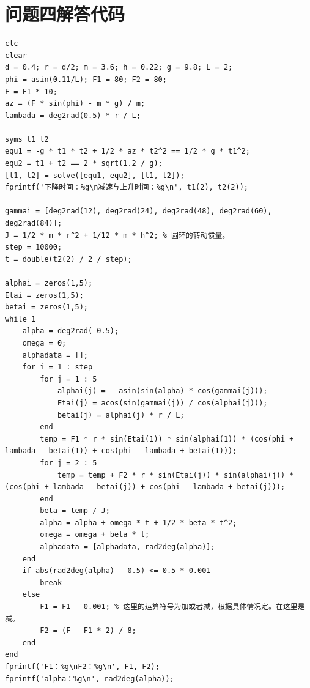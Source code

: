 \documentclass{cumcm}
\begin{document}
\section{问题四解答代码}
\begin{lstlisting}
clc
clear
d = 0.4; r = d/2; m = 3.6; h = 0.22; g = 9.8; L = 2;
phi = asin(0.11/L); F1 = 80; F2 = 80;
F = F1 * 10;
az = (F * sin(phi) - m * g) / m;
lambada = deg2rad(0.5) * r / L;

syms t1 t2
equ1 = -g * t1 * t2 + 1/2 * az * t2^2 == 1/2 * g * t1^2;
equ2 = t1 + t2 == 2 * sqrt(1.2 / g);
[t1, t2] = solve([equ1, equ2], [t1, t2]);
fprintf('下降时间：%g\n减速与上升时间：%g\n', t1(2), t2(2));

gammai = [deg2rad(12), deg2rad(24), deg2rad(48), deg2rad(60), deg2rad(84)];
J = 1/2 * m * r^2 + 1/12 * m * h^2; % 圆环的转动惯量。
step = 10000;
t = double(t2(2) / 2 / step);

alphai = zeros(1,5);
Etai = zeros(1,5);
betai = zeros(1,5);
while 1
    alpha = deg2rad(-0.5);
    omega = 0;
    alphadata = [];
    for i = 1 : step
        for j = 1 : 5
            alphai(j) = - asin(sin(alpha) * cos(gammai(j)));
            Etai(j) = acos(sin(gammai(j)) / cos(alphai(j)));
            betai(j) = alphai(j) * r / L;
        end
        temp = F1 * r * sin(Etai(1)) * sin(alphai(1)) * (cos(phi + lambada - betai(1)) + cos(phi - lambada + betai(1)));
        for j = 2 : 5
            temp = temp + F2 * r * sin(Etai(j)) * sin(alphai(j)) * (cos(phi + lambada - betai(j)) + cos(phi - lambada + betai(j)));
        end
        beta = temp / J;
        alpha = alpha + omega * t + 1/2 * beta * t^2;
        omega = omega + beta * t;
        alphadata = [alphadata, rad2deg(alpha)];
    end
    if abs(rad2deg(alpha) - 0.5) <= 0.5 * 0.001
        break
    else
        F1 = F1 - 0.001; % 这里的运算符号为加或者减，根据具体情况定。在这里是减。
        F2 = (F - F1 * 2) / 8;
    end
end
fprintf('F1：%g\nF2：%g\n', F1, F2);
fprintf('alpha：%g\n', rad2deg(alpha));
\end{lstlisting}
\end{document}

